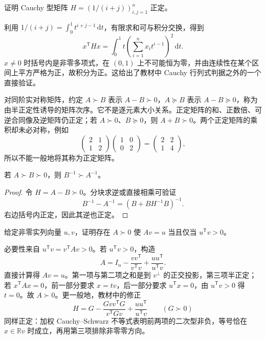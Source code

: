 \begin{example}
证明 Cauchy 型矩阵 $H=(1/(i+j))_{i,j=1}^n$ 正定。
\end{example}
\begin{solve}
利用 $1/(i+j)=\int_0^1t^{i+j-1}\,\mathrm dt$，有限求和可与积分交换，得到
\[
 x^{\mathsf T}Hx=\int_0^1t\left(\sum_{i=1}^n x_it^{i-1}\right)^2\,\mathrm dt.
\]
$x\ne0$ 时括号内是非零多项式，在 $(0,1)$ 上不可能恒为零，并由连续性在某个区间上平方严格为正，故积分为正。这给出了教材中 Cauchy 行列式判据之外的一个直接验证。
\end{solve}

对同阶实对称矩阵，约定 $A\succ B$ 表示 $A-B\succ0$，$A\succeq B$ 表示 $A-B\succeq0$，称为由半正定性诱导的矩阵次序。它不是逐元素大小关系。正定矩阵的和、正数倍、可逆合同像及逆矩阵仍正定；若 $A\succ0$、$B\succeq0$，则 $A+B\succ0$。两个正定矩阵的乘积却未必对称，例如
\[
 \begin{pmatrix}2&1\\1&2\end{pmatrix}
 \begin{pmatrix}1&0\\0&2\end{pmatrix}
 =\begin{pmatrix}2&2\\1&4\end{pmatrix},
\]
所以不能一般地将其称为正定矩阵。

\begin{proposition}
\label{prop:xie-ex-qf-inverse-order}
若 $A\succ B\succ0$，则 $B^{-1}\succ A^{-1}$。
\end{proposition}
\begin{proof}
令 $H=A-B\succ0$。分块求逆或直接相乘可验证
\[
 B^{-1}-A^{-1}=(B+BH^{-1}B)^{-1}.
\]
右边括号内正定，因此其逆也正定。
\end{proof}

\begin{example}
\label{ex:xie-ex-qf-positive-construction}
给定非零实列向量 $u,v$，证明存在 $A\succ0$ 使 $Av=u$ 当且仅当 $u^{\mathsf T}v>0$。
\end{example}
\begin{solve}
必要性来自 $u^{\mathsf T}v=v^{\mathsf T}Av>0$。若 $u^{\mathsf T}v>0$，构造
\[
 A=I_n-\frac{vv^{\mathsf T}}{v^{\mathsf T}v}
     +\frac{uu^{\mathsf T}}{u^{\mathsf T}v}.
\]
直接计算得 $Av=u$。第一项与第二项之和是到 $v^\perp$ 的正交投影，第三项半正定；若 $x^{\mathsf T}Ax=0$，前一部分要求 $x=tv$，后一部分要求 $u^{\mathsf T}x=0$，由 $u^{\mathsf T}v>0$ 得 $t=0$。故 $A\succ0$。更一般地，教材中的修正
\[
 H=G-\frac{Gvv^{\mathsf T}G}{v^{\mathsf T}Gv}
       +\frac{uu^{\mathsf T}}{u^{\mathsf T}v}\qquad(G\succ0)
\]
同样正定：加权 Cauchy--Schwarz 不等式表明前两项的二次型非负，等号恰在 $x\in\mathbb Rv$ 时成立，再用第三项排除非零零方向。
\end{solve}

